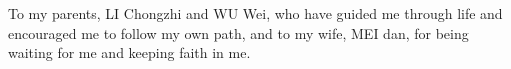 \thispagestyle{empty}
\begin{dedication}
To my parents, LI Chongzhi and WU Wei, who have guided me through life and encouraged me
to follow my own path, and to my wife, MEI dan, for being waiting for me and keeping faith in me.
\end{dedication}
\thispagestyle{empty} \cleardoublepage 
